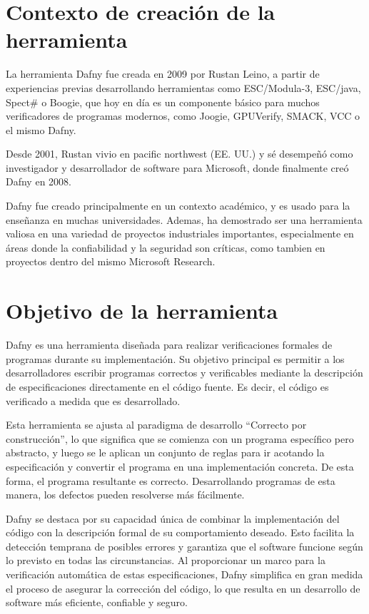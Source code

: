 \documentclass[runningheads]{llncs}
\begin{document}
\section{Contexto de creación de la herramienta}

La herramienta Dafny fue creada en 2009 por Rustan Leino,
a partir de experiencias previas desarrollando herramientas como ESC/Modula-3, ESC/java, Spect\# o Boogie,
que hoy en día es un componente básico para muchos verificadores de programas modernos,
como Joogie, GPUVerify, SMACK, VCC o el mismo Dafny.

Desde 2001, Rustan vivio en pacific northwest (EE. UU.) y sé desempeñó como investigador y desarrollador de software para Microsoft,
donde finalmente creó Dafny en 2008.

Dafny fue creado principalmente en un contexto académico, 
y es usado para la enseñanza en muchas universidades.
Ademas, ha demostrado ser una herramienta valiosa en una variedad de proyectos industriales importantes, 
especialmente en áreas donde la confiabilidad y la seguridad son críticas, 
como tambien en proyectos dentro del mismo Microsoft Research.

\section{Objetivo de la herramienta}

Dafny es una herramienta diseñada para realizar verificaciones formales de programas durante su implementación.
Su objetivo principal es permitir a los desarrolladores escribir programas correctos y verificables mediante la descripción
de especificaciones directamente en el código fuente. Es decir, el código es verificado a medida que es desarrollado.

Esta herramienta se ajusta al paradigma de desarrollo ``Correcto por construcción'', lo que significa que se comienza
con un programa específico pero abstracto, y luego se le aplican un conjunto de reglas para ir acotando la especificación
y convertir el programa en una implementación concreta. De esta forma, el programa resultante es correcto.
Desarrollando programas de esta manera, los defectos pueden resolverse más fácilmente.

Dafny se destaca por su capacidad única de combinar la implementación del código con la descripción formal de su comportamiento
deseado. Esto facilita la detección temprana de posibles errores y garantiza que el software funcione según lo previsto en todas
las circunstancias. Al proporcionar un marco para la verificación automática de estas especificaciones, Dafny simplifica en gran
medida el proceso de asegurar la corrección del código, lo que resulta en un desarrollo de software más eficiente, confiable y seguro.
\end{document}
